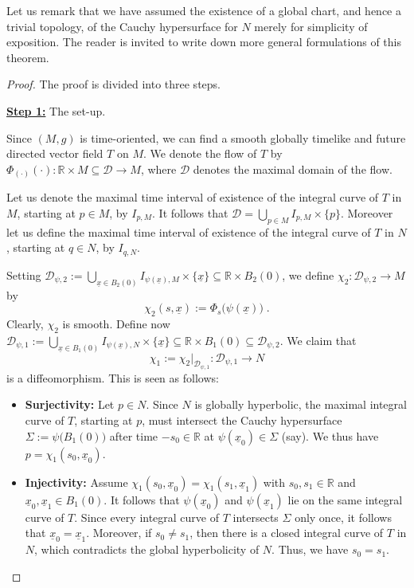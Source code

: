 \documentclass[reqno]{article}
\newcommand{\R}{\mathbb{R}}
\newcommand{\D}{\mathcal{D}}
\newcommand{\ux}{\underline{x}}
\begin{document}
Let us remark that we have assumed the existence of a global chart, and hence a trivial topology, of the Cauchy hypersurface for $N$ merely for simplicity of exposition. The reader is invited to write down more general formulations of this theorem.

\begin{proof}
The proof is divided into three steps.
\vspace*{2mm}

\underline{\textbf{Step 1:}} The set-up.
\vspace*{2mm}

Since $(M,g)$ is time-oriented, we can find a smooth globally timelike and future directed vector field $T$ on $M$. We denote the flow of $T$ by $\Phi_{(\cdot)} (\cdot) : \R \times M \subseteq \D \to M$, where $\D$ denotes the maximal domain of the flow. 

Let us denote the maximal time interval of existence of the integral curve of $T$ in $M$, starting at $p \in M$, by $I_{p,M}$. It follows that $\D = \bigcup_{p \in M} I_{p,M} \times \{p\}$. Moreover let us define the maximal time interval of existence of the integral curve of $T$ in $N$, starting at $q \in N$, by $I_{q,N}$.

Setting $\D_{\psi, 2} := \bigcup_{\underline{x} \in B_2(0)} I_{\psi(\underline{x}),M} \times \{\underline{x}\} \subseteq \R \times B_2(0)$, we define $\chi_2 : \D_{\psi, 2} \to M$ by 
\begin{equation*}
\chi_2(s,\underline{x}) := \Phi_s\big(\psi(\underline{x})\big) \;.
\end{equation*}
Clearly, $\chi_2$ is smooth. Define now $\D_{\psi, 1} := \bigcup_{\underline{x} \in B_1(0)} I_{\psi(\underline{x}), N} \times \{\underline{x}\} \subseteq \R\times B_1(0) \subseteq \D_{\psi, 2}$. We claim that
\begin{equation*}
\chi_1 := \chi_2|_{\D_{\psi,1}} : \D_{\psi, 1} \to N
\end{equation*}
is a diffeomorphism. This is seen as follows:

\begin{itemize}
\item \textbf{Surjectivity:}  Let $p \in N$. Since $N$ is globally hyperbolic, the maximal integral curve of $T$, starting at $p$, must intersect the Cauchy hypersurface $ \Sigma := \psi\big(B_1(0)\big)$ after time $-s_0 \in \R$ at $\psi(\underline{x}_0) \in \Sigma$ (say). We thus have $p = \chi_1(s_0,\underline{x}_0)$.

\item \textbf{Injectivity:} Assume $\chi_1(s_0,\underline{x}_0) = \chi_1(s_1, \underline{x}_1)$ with $s_0, s_1 \in \R$ and $\underline{x}_0, \underline{x}_1 \in B_1(0)$. It follows that $\psi(\ux_0)$ and $\psi(\ux_1)$ lie on the same integral curve of $T$. Since every integral curve of $T$ intersects $\Sigma$ only once, it follows that $\ux_0 = \ux_1$. Moreover, if $s_0 \neq s_1$, then there is a closed integral curve of $T$ in $N$, which contradicts the global hyperbolicity of $N$. Thus, we have $s_0 = s_1$.


\end{itemize}
\end{proof}
\end{document}
